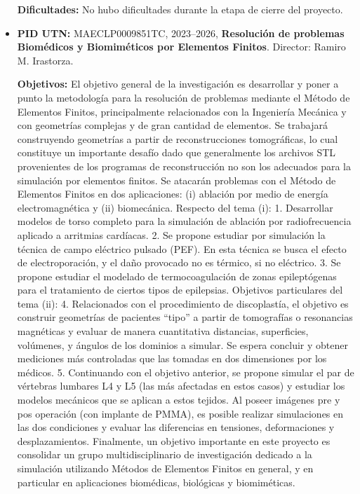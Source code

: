 \documentclass[a4paper,11pt,twoside,final,titlepage,onecolumn,openright]{report}
\begin{document}
\begin{itemize}
\textbf{Dificultades:} No hubo dificultades durante la etapa de cierre del proyecto.

\item {\bf PID UTN:} MAECLP0009851TC, 2023--2026, {\bf Resolución de problemas Biomédicos y Biomiméticos por Elementos Finitos}. Director: Ramiro M. Irastorza.
 
{\bf Objetivos:} El objetivo general de la investigación es desarrollar y poner a punto la metodología para la resolución de problemas mediante el Método de Elementos Finitos, principalmente relacionados con la Ingeniería Mecánica y con geometrías complejas y de gran cantidad de elementos. Se trabajará construyendo geometrías a partir de reconstrucciones tomográficas, lo cual constituye un importante desafío dado que generalmente los archivos STL provenientes de los programas de reconstrucción no son los adecuados para la simulación por elementos finitos. Se atacarán problemas con el Método de Elementos Finitos en dos aplicaciones: (i) ablación por medio de energía electromagnética y (ii) biomecánica. Respecto del tema (i): 1. Desarrollar modelos de torso completo para la simulación de ablación por radiofrecuencia aplicado a arritmias cardíacas. 2. Se propone estudiar por simulación la técnica de campo eléctrico pulsado (PEF). En esta técnica se busca el efecto de electroporación, y el daño provocado no es térmico, si no eléctrico. 3. Se propone estudiar el modelado de termocoagulación de zonas epileptógenas para el tratamiento de ciertos tipos de epilepsias. Objetivos particulares del tema (ii): 4. Relacionados con el procedimiento de discoplastía, el objetivo es construir geometrías de pacientes “tipo” a partir de tomografías o resonancias magnéticas y evaluar de manera cuantitativa distancias, superficies, volúmenes, y ángulos de los dominios a simular. Se espera concluir y obtener mediciones más controladas que las tomadas en dos dimensiones por los médicos. 5. Continuando con el objetivo anterior, se propone simular el par de vértebras lumbares L4 y L5 (las más afectadas en estos casos) y estudiar los modelos mecánicos que se aplican a estos tejidos. Al poseer imágenes pre y pos operación (con implante de PMMA), es posible realizar simulaciones en las dos condiciones y evaluar las diferencias en tensiones, deformaciones y desplazamientos. Finalmente, un objetivo importante en este proyecto es consolidar un grupo multidisciplinario de investigación dedicado a la simulación utilizando Métodos de Elementos Finitos en general, y en particular en aplicaciones biomédicas, biológicas y biomiméticas. 


\end{itemize}
\end{document}
